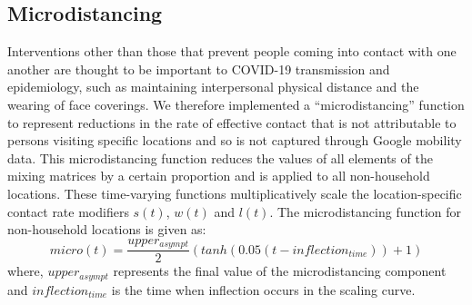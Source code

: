 \subsection{Microdistancing}
\label{microdist}
Interventions other than those that prevent people coming into contact with one another are thought to be important to COVID-19 transmission and epidemiology, such as maintaining interpersonal physical distance and the wearing of face coverings. We therefore implemented a ``microdistancing” function to represent reductions in the rate of effective contact that is not attributable to persons visiting specific locations and so is not captured through Google mobility data. This microdistancing function reduces the values of all elements of the mixing matrices by a certain proportion and is applied to all non-household locations. These time-varying functions multiplicatively scale the location-specific contact rate modifiers \(s(t)\), \(w(t)\) and \(l(t)\). The microdistancing function for non-household locations is given as:
\[micro(t)=\frac{upper_{asympt}} {2} (tanh(0.05(t-inflection_{time}))+1)\]
where, $upper_{asympt}$ represents the final value of the microdistancing component and $inflection_{time}$
is the time when inflection occurs in the scaling curve.

